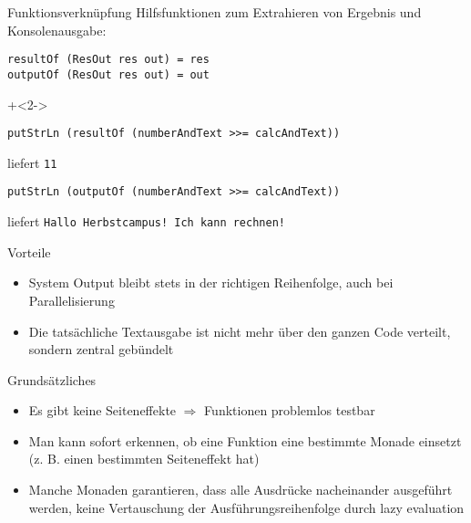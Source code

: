 \begin{frame}[fragile]{Funktionsverknüpfung}
Hilfsfunktionen zum Extrahieren von Ergebnis und Konsolenausgabe:
\begin{lstlisting}
resultOf (ResOut res out) = res
outputOf (ResOut res out) = out
\end{lstlisting}

\onslide+<2->
~

\begin{lstlisting}
putStrLn (resultOf (numberAndText >>= calcAndText))
\end{lstlisting}
liefert \lstinline|11|

\begin{lstlisting}
putStrLn (outputOf (numberAndText >>= calcAndText))
\end{lstlisting}
liefert \lstinline|Hallo Herbstcampus! Ich kann rechnen!|

\end{frame}


\begin{frame}[fragile]{Vorteile}

\begin{itemize}
\item System Output bleibt stets in der richtigen Reihenfolge, auch bei Parallelisierung
\item Die tatsächliche Textausgabe ist nicht mehr über den ganzen Code verteilt, sondern zentral gebündelt
\end{itemize}

\end{frame}




\begin{frame}[fragile]{Grundsätzliches}

\begin{itemize}

\item Es gibt keine Seiteneffekte $\Rightarrow$ Funktionen problemlos testbar

\item Man kann sofort erkennen, ob eine Funktion eine bestimmte Monade einsetzt (z. B. einen bestimmten Seiteneffekt hat)

\item Manche Monaden garantieren, dass alle Ausdrücke nacheinander ausgeführt werden, keine Vertauschung der Ausführungsreihenfolge durch lazy evaluation

\end{itemize}


\end{frame}


